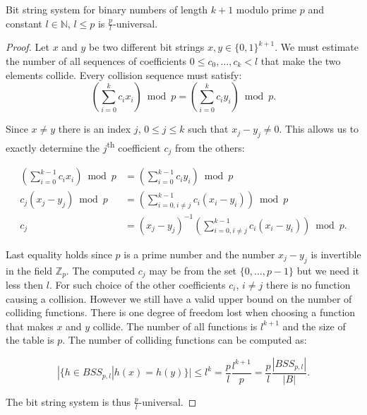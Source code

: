 \begin{remark}
Bit string system for binary numbers of length $k + 1$ modulo prime $p$ and constant $l \in \mathbb{N}$, $l \leq p$ is $\frac{p}{l}$-universal.
\end{remark}
\begin{proof}
Let $x$ and $y$ be two different bit strings $x, y \in \{0, 1\} ^ {k + 1}$. We must estimate the number of all sequences of coefficients $0 \leq c_0, \dots, c_k < l$ that make the two elements collide. Every collision sequence must satisfy:
\[
\left( \displaystyle \sum_{i = 0}^{k} c_i x_i \right) \bmod p = \left( \displaystyle \sum_{i = 0}^{k} c_i y_i \right) \bmod p \text{.}
\]

Since $x \neq y$ there is an index $j$, $0 \leq j \leq k$ such that $x_j - y_j \neq 0$. This allows us to exactly determine the $j$\textsuperscript{th} coefficient $c_j$ from the others:

\begin{displaymath}
\begin{split}
\left(\displaystyle \sum_{i=0}^{k-1} c_i x_i\right) \bmod p & = \left(\displaystyle \sum_{i=0}^{k-1} c_i y_i\right) \bmod p \\
c_j(x_j - y_j) \bmod p & = \left(\displaystyle \sum_{i=0, i \neq j}^{k-1} c_i (x_i - y_i)\right) \bmod p \\
c_j & = (x_j - y_j) ^ {-1}\left(\displaystyle \sum_{i=0, i \neq j}^{k-1} c_i (x_i - y_i)\right) \bmod p \text{.}
\end{split}
\end{displaymath}

Last equality holds since $p$ is a prime number and the number $x_j - y_j$ is invertible in the field $\mathbb{Z}_p$. The computed $c_j$ may be from the set $\{0, \dots, p - 1\}$ but we need it less then $l$. For such choice of the other coefficients $c_i$, $i \neq j$ there is no function causing a collision. However we still have a valid upper bound on the number of colliding functions. There is one degree of freedom lost when choosing a function that makes $x$ and $y$ collide. The number of all functions is $l ^ {k + 1}$ and the size of the table is $p$. The number of colliding functions can be computed as:

\begin{displaymath}
|\{h \in BSS_{p, l} | h(x) = h(y) \}| \leq l^{k} = \frac{p}{l}\frac{l^{k + 1}}{p} = \frac{p}{l}\frac{|BSS_{p, l}|}{|B|} \text{.}
\end{displaymath}

The bit string system is thus $\frac{p}{l}$-universal.
\end{proof}


